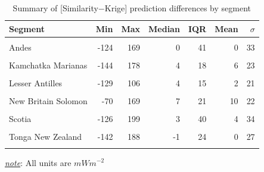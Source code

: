 \begin{table}

\caption{\label{tab:diffSummaryTable}Summary of [Similarity$-$Krige] prediction differences by segment}
\centering
\begin{threeparttable}
\begin{tabular}[t]{lrrrrrr}
\toprule
Segment & Min & Max & Median & IQR & Mean & $\sigma$\\
\midrule
\cellcolor{gray!6}{Alaska Aleutians} & \cellcolor{gray!6}{-1000} & \cellcolor{gray!6}{126} & \cellcolor{gray!6}{2} & \cellcolor{gray!6}{22} & \cellcolor{gray!6}{-1} & \cellcolor{gray!6}{43}\\
Andes & -124 & 169 & 0 & 41 & 0 & 33\\
\cellcolor{gray!6}{Central America} & \cellcolor{gray!6}{-128} & \cellcolor{gray!6}{205} & \cellcolor{gray!6}{12} & \cellcolor{gray!6}{50} & \cellcolor{gray!6}{20} & \cellcolor{gray!6}{42}\\
Kamchatka Marianas & -144 & 178 & 4 & 18 & 6 & 23\\
\cellcolor{gray!6}{Kyushu Ryukyu} & \cellcolor{gray!6}{-123} & \cellcolor{gray!6}{167} & \cellcolor{gray!6}{4} & \cellcolor{gray!6}{21} & \cellcolor{gray!6}{6} & \cellcolor{gray!6}{23}\\
Lesser Antilles & -129 & 106 & 4 & 15 & 2 & 21\\
\cellcolor{gray!6}{N Philippines} & \cellcolor{gray!6}{-144} & \cellcolor{gray!6}{141} & \cellcolor{gray!6}{8} & \cellcolor{gray!6}{25} & \cellcolor{gray!6}{11} & \cellcolor{gray!6}{22}\\
New Britain Solomon & -70 & 169 & 7 & 21 & 10 & 22\\
\cellcolor{gray!6}{S Philippines} & \cellcolor{gray!6}{-79} & \cellcolor{gray!6}{189} & \cellcolor{gray!6}{6} & \cellcolor{gray!6}{25} & \cellcolor{gray!6}{9} & \cellcolor{gray!6}{23}\\
Scotia & -126 & 199 & 3 & 40 & 4 & 34\\
\cellcolor{gray!6}{Sumatra Banda Sea} & \cellcolor{gray!6}{-153} & \cellcolor{gray!6}{144} & \cellcolor{gray!6}{3} & \cellcolor{gray!6}{21} & \cellcolor{gray!6}{2} & \cellcolor{gray!6}{22}\\
Tonga New Zealand & -142 & 188 & -1 & 24 & 0 & 27\\
\cellcolor{gray!6}{Vanuatu} & \cellcolor{gray!6}{-147} & \cellcolor{gray!6}{204} & \cellcolor{gray!6}{14} & \cellcolor{gray!6}{31} & \cellcolor{gray!6}{13} & \cellcolor{gray!6}{34}\\
\bottomrule
\end{tabular}
\begin{tablenotes}
\item \uline{\textit{note}}: All units are $mWm^{-2}$
\end{tablenotes}
\end{threeparttable}
\end{table}

